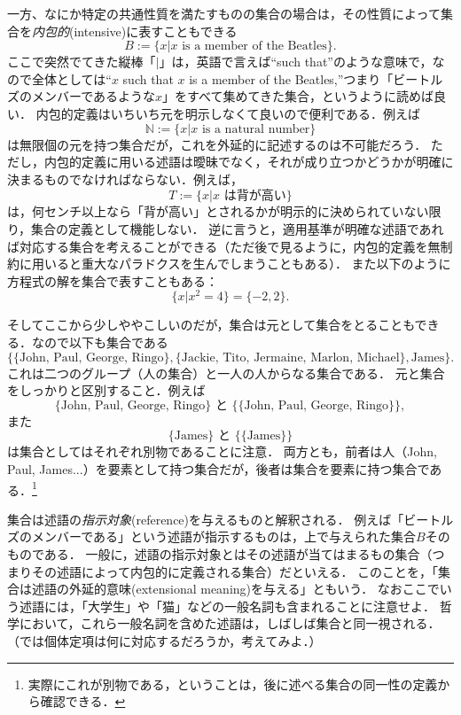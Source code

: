 \documentclass[11pt,a4paper]{jsarticle}
\begin{document}
一方、なにか特定の共通性質を満たすものの集合の場合は，その性質によって集合を\emph{内包的}(intensive)に表すこともできる
\[
 B := \{x | x \text{ is a member of the Beatles}\}.
\]
ここで突然でてきた縦棒「$|$」は，英語で言えば``such that''のような意味で，なので全体としては``$x$ such that $x$ is a member of the Beatles,''つまり「ビートルズのメンバーであるような$x$」をすべて集めてきた集合，というように読めば良い．
内包的定義はいちいち元を明示しなくて良いので便利である．例えば
\[
 \mathbb{N} := \{x | x \text{ is a natural number}\}
\]
は無限個の元を持つ集合だが，これを外延的に記述するのは不可能だろう．
ただし，内包的定義に用いる述語は曖昧でなく，それが成り立つかどうかが明確に決まるものでなければならない．例えば，
\[
 T := \{x | x \text{ は背が高い}\}
\]
は，何センチ以上なら「背が高い」とされるかが明示的に決められていない限り，集合の定義として機能しない．
逆に言うと，適用基準が明確な述語であれば対応する集合を考えることができる（ただ後で見るように，内包的定義を無制約に用いると重大なパラドクスを生んでしまうこともある）．
また以下のように方程式の解を集合で表すこともある：
\[
 \{ x | x^2 = 4\} = \{ -2, 2 \}.
\]


そしてここから少しややこしいのだが，集合は元として集合をとることもできる．なので以下も集合である
\[
\{ \{\text{John, Paul, George, Ringo}\}, \{ \text{Jackie, Tito, Jermaine, Marlon, Michael}\}, \text{James} \}.
\]
これは二つのグループ（人の集合）と一人の人からなる集合である．
元と集合をしっかりと区別すること．例えば
\[
\{\text{John, Paul, George, Ringo}\} \text{ と } \{ \{\text{John, Paul, George, Ringo}\} \},
\]
また
\[
\{\text{James}\} \text{ と } \{ \{\text{James}\} \}  
\]
は集合としてはそれぞれ別物であることに注意．
両方とも，前者は人（John, Paul, James...）を要素として持つ集合だが，後者は集合を要素に持つ集合である．\footnote{実際にこれが別物である，ということは，後に述べる集合の同一性の定義から確認できる．}



\begin{example}
集合は述語の\emph{指示対象}(reference)を与えるものと解釈される．
例えば「ビートルズのメンバーである」という述語が指示するものは，上で与えられた集合$B$そのものである．
一般に，述語の指示対象とはその述語が当てはまるもの集合（つまりその述語によって内包的に定義される集合）だといえる．
このことを，「集合は述語の外延的意味(extensional meaning)を与える」ともいう．
なおここでいう述語には，「大学生」や「猫」などの一般名詞も含まれることに注意せよ．
哲学において，これら一般名詞を含めた述語は，しばしば集合と同一視される．
（では個体定項は何に対応するだろうか，考えてみよ．）
\end{example}
\end{document}
